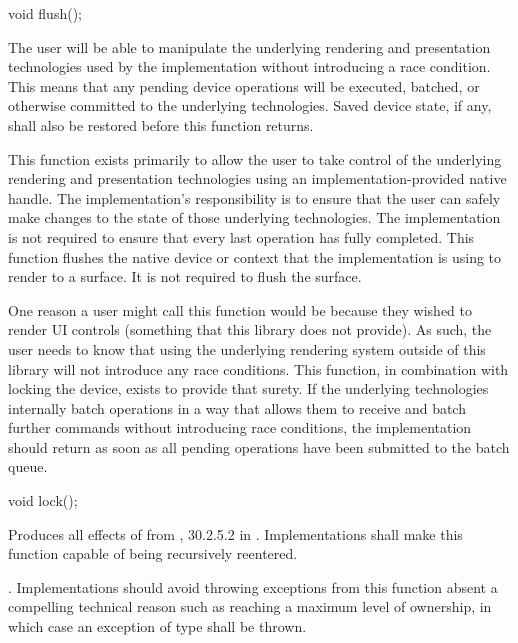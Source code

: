 %
%
\begin{itemdecl}
void flush();
\end{itemdecl}
\begin{itemdescr}
	\pnum
	\effects
	The user will be able to manipulate the underlying rendering and 
	presentation technologies used by the implementation without introducing a 
	race condition. This means that any pending device operations will be 
	executed, batched, or otherwise committed to the underlying technologies. 
	Saved device state, if any, shall also be restored before this function 
	returns.

	\pnum
	\remarks
	This function exists primarily to allow the user to take control of the 
	underlying rendering and presentation technologies using an 
	implementation-provided native handle. The implementation's responsibility 
	is to ensure that the user can safely make changes to the state of those 
	underlying technologies. The implementation is not required to ensure that 
	every last operation has fully completed.
	\enternote
	This function flushes the native device or context that the implementation 
	is using to render to a surface. It is not required to flush the surface.
	\exitnote
	
	\pnum
	\realnotes
	One reason a user might call this function would be because they wished to 
	render UI controls (something that this library does not provide). As such, the user needs to know that using the underlying rendering system outside of this library will not introduce any race conditions. This function, in combination with locking the device, exists to provide that surety. If the underlying technologies internally batch operations in a way that allows them to receive and batch further commands without introducing race conditions, the implementation should return as soon as all pending operations have been submitted to the batch queue.
\end{itemdescr}

\begin{itemdecl}
void lock();
\end{itemdecl}
\begin{itemdescr}
	\pnum
	\effects
	Produces all effects of  from , 
	30.2.5.2 in \CppXIV. Implementations shall make this function capable of 
	being recursively reentered.
	
	\pnum
	\throws
	.
	\enternote
	Implementations should avoid throwing exceptions from this function absent 
	a compelling technical reason such as reaching a maximum level of 
	ownership, in which case an exception of type  
	shall be thrown.
	\exitnote
\end{itemdescr}

